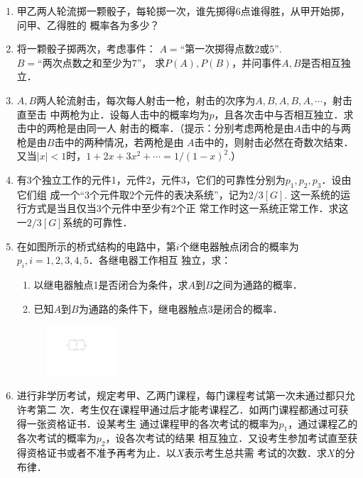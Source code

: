 \documentclass[10pt,a4paper]{article}
\begin{document}
\begin{enumerate}
    \item 甲乙两人轮流掷一颗骰子，每轮掷一次，谁先掷得6点谁得胜，从甲开始掷，问甲、乙得胜的
    概率各为多少？
    \clearpage



    \item 将一颗骰子掷两次，考虑事件： $A=\mbox{“第一次掷得点数2或5”}$.$B=\mbox{“两次点数之和至少为7”}$，
    求$P(A),P(B)$，并问事件$A,B$是否相互独立．
    \clearpage


    \item $A,B$两人轮流射击，每次每人射击一枪，射击的次序为$A,B,A,B,A,\cdots$，射击直至击
    中两枪为止．设每人击中的概率均为$p$，且各次击中与否相互独立．求击中的两枪是由同一人
    射击的概率．（提示：分别考虑两枪是由$A$击中的与两枪是由$B$击中的两种情况，若两枪是由
    $A$击中的，则射击必然在奇数次结束．又当$|x|<1$时，$1+2x+3x^2+\cdots=1/(1-x)^2$.）
    \clearpage



    \item 有3个独立工作的元件1，元件2，元件3，它们的可靠性分别为$p_1,p_2,p_3$．设由它们组
    成一个“3个元件取2个元件的表决系统”，记为$2/3[G]$. 这一系统的运行方式是当且仅当3个元件中至少有2个正
    常工作时这一系统正常工作．求这一$2/3[G]$系统的可靠性．
    \clearpage


    \item 在如图所示的桥式结构的电路中，第$i$个继电器触点闭合的概率为$p_i,i=1,2,3,4,5$．各继电器工作相互
    独立，求：
    \begin{enumerate}
        \item 以继电器触点1是否闭合为条件，求$A$到$B$之间为通路的概率．
        \item 已知$A$到$B$为通路的条件下，继电器触点3是闭合的概率．
    \end{enumerate}
    \begin{figure}[H]
        \flushright 
        \includegraphics[width=0.25\textwidth]{8.pdf}
    \end{figure}
    \vspace{-0.5cm}
    \clearpage



    \item 进行非学历考试，规定考甲、乙两门课程，每门课程考试第一次未通过都只允许考第二
    次．考生仅在课程甲通过后才能考课程乙．如两门课程都通过可获得一张资格证书．设某考生
    通过课程甲的各次考试的概率为$p_1$，通过课程乙的各次考试的概率为$p_2$，设各次考试的结果
    相互独立．又设考生参加考试直至获得资格证书或者不准予再考为止．以$X$表示考生总共需
    考试的次数．求$X$的分布律．
    \clearpage



\end{enumerate}
\end{document}
